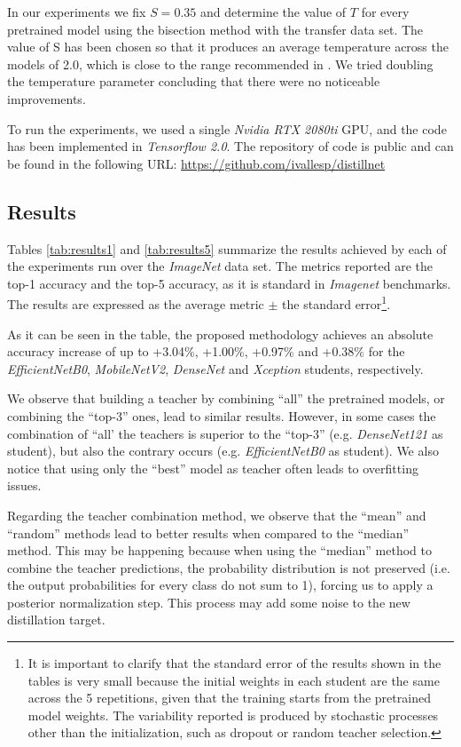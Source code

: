 \documentclass{elsarticle}
\begin{document}
	 In our experiments we fix $S=0.35$ and determine the value of $T$ for every pretrained model using the bisection method with the transfer data set. The value of S has been chosen so that it produces an average temperature across the models of 2.0, which is close to the range recommended in \cite{hinton2015}. We tried doubling the temperature parameter concluding that there were no noticeable improvements.
	 
	 To run the experiments, we used a single \textit{Nvidia RTX 2080ti} GPU, and the code has been implemented in \textit{Tensorflow 2.0}. The repository of code is public and can be found in the following URL: \url{https://github.com/ivallesp/distillnet}
		
	\subsection{Results}  \label{sec:results}
	Tables \ref{tab:results1} and \ref{tab:results5} summarize the results achieved by each of the experiments run over the \textit{ImageNet} data set. The metrics reported are the top-1 accuracy and the top-5 accuracy, as it is standard in \textit{Imagenet} benchmarks. The results are expressed as the average metric $\pm$ the standard error\footnote{It is important to clarify that the standard error of the results shown in the tables is very small because the initial weights in each student are the same across the 5 repetitions, given that the training starts from the pretrained model weights. The variability reported is produced by stochastic processes other than the initialization, such as dropout or random teacher selection.}.  
	
	As it can be seen in the table, the proposed methodology achieves an absolute accuracy increase of up to +3.04\%, +1.00\%, +0.97\% and +0.38\% for the \textit{EfficientNetB0}, \textit{MobileNetV2},  \textit{DenseNet} and \textit{Xception} students, respectively. 
	
	We observe that building a teacher by combining ``all'' the pretrained models, or combining the ``top-3'' ones, lead to similar results. However, in some cases the combination of ``all' the teachers is superior to the ``top-3'' (e.g. \textit{DenseNet121} as student), but also the contrary occurs (e.g. \textit{EfficientNetB0} as student). We also notice that using only the ``best'' model as teacher often leads to overfitting issues.  
	
	Regarding the teacher combination method, we observe that the ``mean'' and ``random'' methods lead to better results when compared to the ``median'' method. This may be happening because when using the ``median'' method to combine the teacher predictions, the probability distribution is not preserved (i.e. the output probabilities for every class do not sum to 1), forcing us to apply a posterior normalization step. This process may add some noise to the new distillation target.
	
\end{document}
